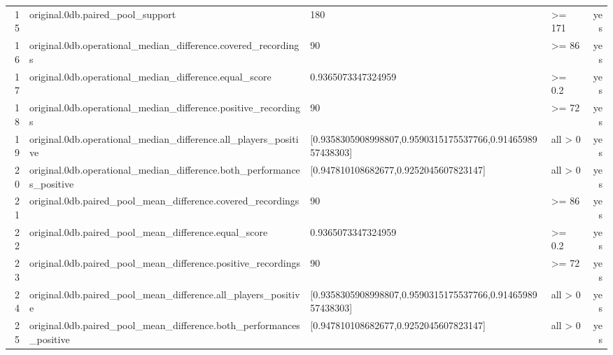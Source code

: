 \documentclass{article}
\begin{document}
\begin{longtable}{r p{5cm} p{4cm} p{2.5cm} r}
15 & original.\allowbreak{}0db.\allowbreak{}paired\_\allowbreak{}pool\_\allowbreak{}support & 180 & >= 171 & yes \\
16 & original.\allowbreak{}0db.\allowbreak{}operational\_\allowbreak{}median\_\allowbreak{}difference.\allowbreak{}covered\_\allowbreak{}recordings & 90 & >= 86 & yes \\
17 & original.\allowbreak{}0db.\allowbreak{}operational\_\allowbreak{}median\_\allowbreak{}difference.\allowbreak{}equal\_\allowbreak{}score & 0.\allowbreak{}9365073347324959 & >= 0.\allowbreak{}2 & yes \\
18 & original.\allowbreak{}0db.\allowbreak{}operational\_\allowbreak{}median\_\allowbreak{}difference.\allowbreak{}positive\_\allowbreak{}recordings & 90 & >= 72 & yes \\
19 & original.\allowbreak{}0db.\allowbreak{}operational\_\allowbreak{}median\_\allowbreak{}difference.\allowbreak{}all\_\allowbreak{}players\_\allowbreak{}positive & [0.\allowbreak{}9358305908998807,\allowbreak{}0.\allowbreak{}9590315175537766,\allowbreak{}0.\allowbreak{}9146598957438303] & all > 0 & yes \\
20 & original.\allowbreak{}0db.\allowbreak{}operational\_\allowbreak{}median\_\allowbreak{}difference.\allowbreak{}both\_\allowbreak{}performances\_\allowbreak{}positive & [0.\allowbreak{}947810108682677,\allowbreak{}0.\allowbreak{}9252045607823147] & all > 0 & yes \\
21 & original.\allowbreak{}0db.\allowbreak{}paired\_\allowbreak{}pool\_\allowbreak{}mean\_\allowbreak{}difference.\allowbreak{}covered\_\allowbreak{}recordings & 90 & >= 86 & yes \\
22 & original.\allowbreak{}0db.\allowbreak{}paired\_\allowbreak{}pool\_\allowbreak{}mean\_\allowbreak{}difference.\allowbreak{}equal\_\allowbreak{}score & 0.\allowbreak{}9365073347324959 & >= 0.\allowbreak{}2 & yes \\
23 & original.\allowbreak{}0db.\allowbreak{}paired\_\allowbreak{}pool\_\allowbreak{}mean\_\allowbreak{}difference.\allowbreak{}positive\_\allowbreak{}recordings & 90 & >= 72 & yes \\
24 & original.\allowbreak{}0db.\allowbreak{}paired\_\allowbreak{}pool\_\allowbreak{}mean\_\allowbreak{}difference.\allowbreak{}all\_\allowbreak{}players\_\allowbreak{}positive & [0.\allowbreak{}9358305908998807,\allowbreak{}0.\allowbreak{}9590315175537766,\allowbreak{}0.\allowbreak{}9146598957438303] & all > 0 & yes \\
25 & original.\allowbreak{}0db.\allowbreak{}paired\_\allowbreak{}pool\_\allowbreak{}mean\_\allowbreak{}difference.\allowbreak{}both\_\allowbreak{}performances\_\allowbreak{}positive & [0.\allowbreak{}947810108682677,\allowbreak{}0.\allowbreak{}9252045607823147] & all > 0 & yes \\

\end{longtable}
\end{document}

